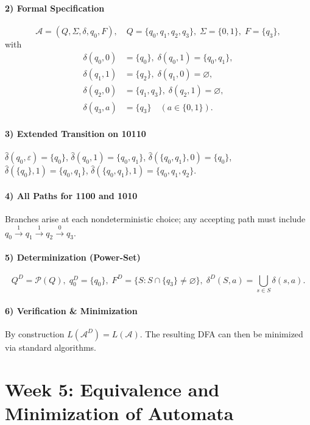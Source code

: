 \documentclass{article}
\theoremstyle{theorem}
\theoremstyle{definition}
\theoremstyle{remark}
\begin{document}
\paragraph{2) Formal Specification}  
\[
\mathcal{A} = (Q,\Sigma,\delta,q_0,F),
\quad
Q=\{q_0,q_1,q_2,q_3\},\;\Sigma=\{0,1\},\;F=\{q_3\},
\]
with
\[
\begin{aligned}
\delta(q_0,0)&=\{q_0\},\;\delta(q_0,1)=\{q_0,q_1\},\\
\delta(q_1,1)&=\{q_2\},\;\delta(q_1,0)=\varnothing,\\
\delta(q_2,0)&=\{q_1,q_3\},\;\delta(q_2,1)=\varnothing,\\
\delta(q_3,a)&=\{q_3\}\quad(a\in\{0,1\}).
\end{aligned}
\]

\paragraph{3) Extended Transition on 10110}  
\(\hat{\delta}(q_0,\varepsilon)=\{q_0\}\),  
\(\hat{\delta}(q_0,1)=\{q_0,q_1\}\),  
\(\hat{\delta}(\{q_0,q_1\},0)=\{q_0\}\),  
\(\hat{\delta}(\{q_0\},1)=\{q_0,q_1\}\),  
\(\hat{\delta}(\{q_0,q_1\},1)=\{q_0,q_1,q_2\}\).

\paragraph{4) All Paths for 1100 and 1010}  
Branches arise at each nondeterministic choice; any accepting path must include  
\(q_0\xrightarrow{1}q_1\xrightarrow{1}q_2\xrightarrow{0}q_3\).

\paragraph{5) Determinization (Power-Set)}  
\[
Q^D=\mathcal{P}(Q),\;
q_0^D=\{q_0\},\;
F^D=\{S:S\cap\{q_3\}\neq\varnothing\},\;
\delta^D(S,a)=\bigcup_{s\in S}\delta(s,a).
\]

\paragraph{6) Verification \& Minimization}  
By construction \(L(\mathcal{A}^D)=L(\mathcal{A})\). The resulting DFA can then be minimized via standard algorithms.

\newpage

\section{Week 5: Equivalence and Minimization of Automata}
\end{document}
